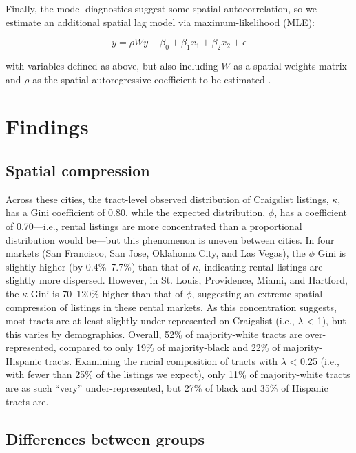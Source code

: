 \documentclass[11pt,letterpaper]{article}
\begin{document}
Finally, the model diagnostics suggest some spatial autocorrelation, so we estimate an additional spatial lag model via maximum-likelihood (MLE):

\begin{equation}
	\label{eq:regression_formula}
	y = \rho Wy + \beta_0 + \beta_1 x_1 + \beta_2 x_2 + \epsilon
\end{equation}

with variables defined as above, but also including $W$ as a spatial weights matrix and $\rho$ as the spatial autoregressive coefficient to be estimated \citep{anselin_spatial_1988}.


\section{Findings}

\subsection{Spatial compression}

Across these cities, the tract-level observed distribution of Craigslist listings, $\kappa$, has a Gini coefficient of 0.80, while the expected distribution, $\phi$, has a coefficient of 0.70---i.e., rental listings are more concentrated than a proportional distribution would be---but this phenomenon is uneven between cities. In four markets (San Francisco, San Jose, Oklahoma City, and Las Vegas), the $\phi$ Gini is slightly higher (by 0.4\%--7.7\%) than that of $\kappa$, indicating rental listings are slightly more dispersed. However, in St. Louis, Providence, Miami, and Hartford, the $\kappa$ Gini is 70--120\% higher than that of $\phi$, suggesting an extreme spatial compression of listings in these rental markets. As this concentration suggests, most tracts are at least slightly under-represented on Craigslist (i.e., $\lambda$ < 1), but this varies by demographics. Overall, 52\% of majority-white tracts are over-represented, compared to only 19\% of majority-black and 22\% of majority-Hispanic tracts. Examining the racial composition of tracts with $\lambda$ < 0.25 (i.e., with fewer than 25\% of the listings we expect), only 11\% of majority-white tracts are as such \enquote{very} under-represented, but 27\% of black and 35\% of Hispanic tracts are.

\subsection{Differences between groups}
\end{document}
